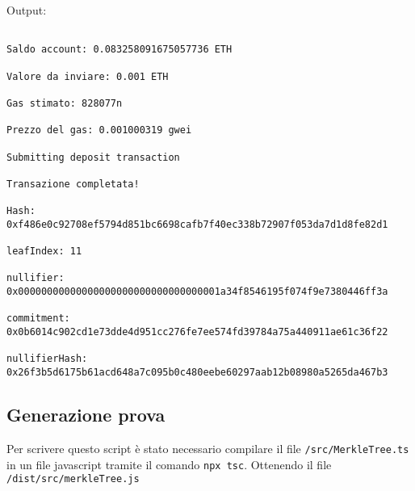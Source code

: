 Output:

\begin{verbatim}

Saldo account: 0.083258091675057736 ETH

Valore da inviare: 0.001 ETH

Gas stimato: 828077n

Prezzo del gas: 0.001000319 gwei

Submitting deposit transaction

Transazione completata! 

Hash: 0xf486e0c92708ef5794d851bc6698cafb7f40ec338b72907f053da7d1d8fe82d1

leafIndex: 11

nullifier: 0x00000000000000000000000000000000001a34f8546195f074f9e7380446ff3a

commitment: 0x0b6014c902cd1e73dde4d951cc276fe7ee574fd39784a75a440911ae61c36f22

nullifierHash: 0x26f3b5d6175b61acd648a7c095b0c480eebe60297aab12b08980a5265da467b3
\end{verbatim}


\subsection{Generazione prova}

Per scrivere questo script è stato necessario compilare il file \verb|/src/MerkleTree.ts| in un file javascript tramite il comando \verb|npx tsc|. Ottenendo il file \verb|/dist/src/merkleTree.js|

